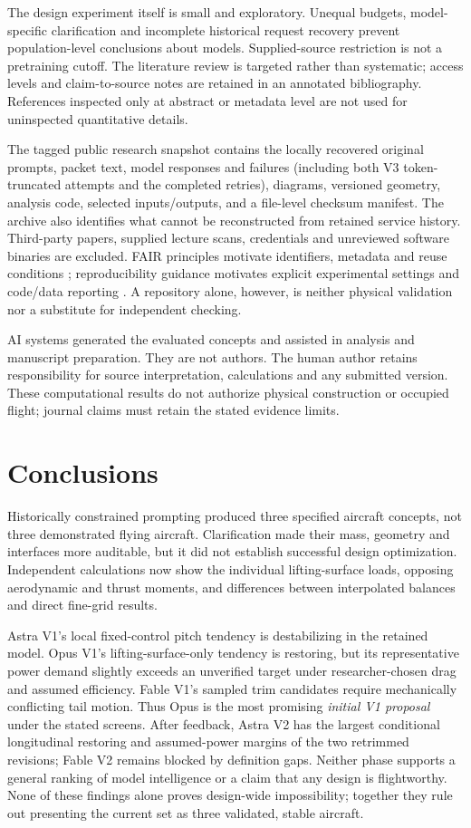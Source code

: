 \documentclass[10pt,letterpaper]{article}
\begin{document}
The design experiment itself is small and exploratory. Unequal budgets, model-specific clarification and incomplete historical request recovery prevent population-level conclusions about models. Supplied-source restriction is not a pretraining cutoff. The literature review is targeted rather than systematic; access levels and claim-to-source notes are retained in an annotated bibliography. References inspected only at abstract or metadata level are not used for uninspected quantitative details.

The tagged public research snapshot contains the locally recovered original prompts, packet text, model responses and failures (including both V3 token-truncated attempts and the completed retries), diagrams, versioned geometry, analysis code, selected inputs/outputs, and a file-level checksum manifest. The archive also identifies what cannot be reconstructed from retained service history. Third-party papers, supplied lecture scans, credentials and unreviewed software binaries are excluded. FAIR principles motivate identifiers, metadata and reuse conditions \cite{ref33}; reproducibility guidance motivates explicit experimental settings and code/data reporting \cite{ref34}. A repository alone, however, is neither physical validation nor a substitute for independent checking.

AI systems generated the evaluated concepts and assisted in analysis and manuscript preparation. They are not authors. The human author retains responsibility for source interpretation, calculations and any submitted version. These computational results do not authorize physical construction or occupied flight; journal claims must retain the stated evidence limits.

\section{Conclusions}
Historically constrained prompting produced three specified aircraft concepts, not three demonstrated flying aircraft. Clarification made their mass, geometry and interfaces more auditable, but it did not establish successful design optimization. Independent calculations now show the individual lifting-surface loads, opposing aerodynamic and thrust moments, and differences between interpolated balances and direct fine-grid results.

Astra V1's local fixed-control pitch tendency is destabilizing in the retained model. Opus V1's lifting-surface-only tendency is restoring, but its representative power demand slightly exceeds an unverified target under researcher-chosen drag and assumed efficiency. Fable V1's sampled trim candidates require mechanically conflicting tail motion. Thus Opus is the most promising \emph{initial V1 proposal} under the stated screens. After feedback, Astra V2 has the largest conditional longitudinal restoring and assumed-power margins of the two retrimmed revisions; Fable V2 remains blocked by definition gaps. Neither phase supports a general ranking of model intelligence or a claim that any design is flightworthy. None of these findings alone proves design-wide impossibility; together they rule out presenting the current set as three validated, stable aircraft.
\end{document}

